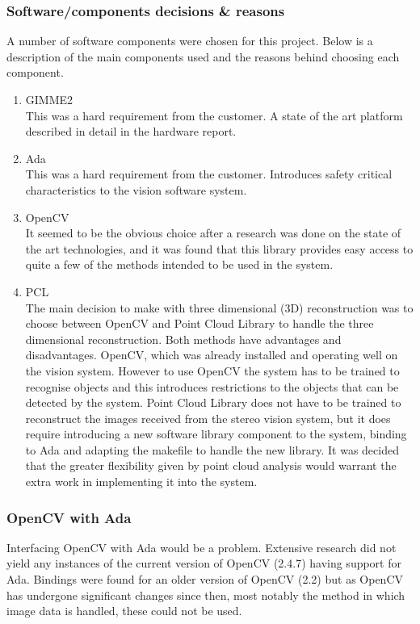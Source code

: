\subsubsection{Software/components decisions \& reasons}
A number of software components were chosen for this project. Below is a description of the main components used and the reasons behind choosing each component. 
\begin{enumerate}
  \item GIMME2 \\ This was a hard requirement from the customer. A state of the art platform described in detail in the hardware report.
  \item Ada \\ This was a hard requirement from the customer. Introduces safety critical characteristics to the vision software system.
  \item OpenCV \\ It seemed to be the obvious choice after a research was done on the state of the art technologies, and it was found that this library provides easy access to quite a few of the methods intended to be used in the system.
  \item PCL \\ The main decision to make with three dimensional (3D) reconstruction was to choose between OpenCV and Point Cloud Library to handle the three dimensional reconstruction. Both methods have advantages and disadvantages. OpenCV, which was already installed and operating well on the vision system. However to use OpenCV the system has to be trained to recognise objects and this introduces restrictions to the objects that can be detected by the system.
Point Cloud Library does not have to be trained to reconstruct the images received from the stereo vision system, but it does require introducing a new software library component to the system, binding to Ada and adapting the makefile to handle the new library.
It was decided that the greater flexibility given by point cloud analysis would warrant the extra work in implementing it into the system.
\end{enumerate}

\subsubsection{OpenCV with Ada}
Interfacing OpenCV with Ada would be a problem. Extensive research did not yield any instances of the current version of OpenCV (2.4.7) having support for Ada. Bindings were found for an older version of OpenCV (2.2) \cite{web:oldAdaBindings} but as OpenCV has undergone significant changes since then, most notably the method in which image data is handled, these could not be used.

